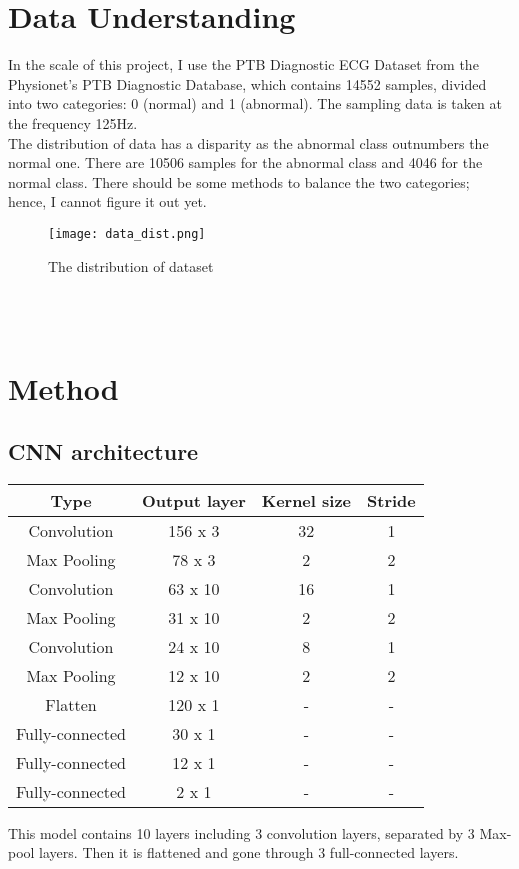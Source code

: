 \documentclass[conference]{IEEEtran}
\begin{document}
\section{Data Understanding}
In the scale of this project, I use the PTB Diagnostic ECG Dataset from the Physionet's PTB Diagnostic Database, which contains 14552 samples, divided into two categories: 0 (normal) and 1 (abnormal). The sampling data is taken at the frequency 125Hz.\\
The distribution of data has a disparity as the abnormal class outnumbers the normal one. There are 10506 samples for the abnormal class and 4046 for the normal class. There should be some methods to balance the two categories; hence, I cannot figure it out yet.
\begin{figure}[hbt!]
    \centering
    \texttt{[image: data\_dist.png]}
    \caption{The distribution of dataset}
    \label{fig:Pipeline}
\end{figure}
\mbox{}\\\\

\section{Method}
\subsection{CNN architecture}

\begin{center}

\begin{tabular}{||c c c c||}
 \hline
 Type & Output layer & Kernel size & Stride \\ [0.5ex] 
 \hline\hline
 Convolution & 156 x 3 & 32 & 1 \\ 
 \hline
 Max Pooling & 78 x 3 & 2 & 2 \\
 \hline
 Convolution & 63 x 10 & 16 & 1 \\
 \hline
 Max Pooling & 31 x 10 & 2 & 2 \\
 \hline
 Convolution & 24 x 10 & 8 & 1 \\
 \hline
 Max Pooling & 12 x 10 & 2 & 2 \\
 \hline
 Flatten & 120 x 1 & - & - \\
 \hline
 Fully-connected & 30 x 1 & - & - \\
 \hline 
 Fully-connected & 12 x 1 & - & - \\
 \hline 
 Fully-connected & 2 x 1 & - & - \\[1ex] 
 \hline
\end{tabular}
\end{center}
This model contains 10 layers including 3 convolution layers, separated by 3 Max-pool layers. Then it is flattened and gone through 3 full-connected layers.
\end{document}
